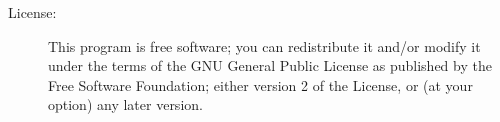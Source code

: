 \begin{description}
    \item[License:] This program is free software; you can redistribute it and/or modify it under the terms of the GNU General Public License as published by the Free Software Foundation; either version 2 of the License, or (at your option) any later version.
\end{description}

